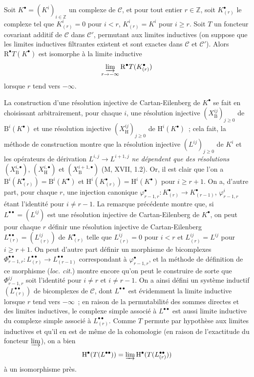 \begin{lemma}[11.5.1]
\label{0.11.5.1-fr}
Soit $K^\bullet=(K^i)_{i\in\mathbb Z}$ un complexe de $\mathcal C$, et pour
tout entier $r\in\mathbb Z$, soit $K_{(r)}^\bullet$ le complexe tel que
$K_{(r)}^i=0$ pour $i<r$, $K_{(r)}^i=K^i$ pour $i\geq r$. Soit $T$ un
foncteur covariant additif
de $\mathcal C$ dans $\mathcal C'$, permutant aux
limites inductives (on suppose que les limites inductives filtrantes existent
et sont exactes dans $\mathcal C$ et $\mathcal C'$). Alors
$\mathrm R^\bullet T(K^\bullet)$ est isomorphe à la limite inductive
\[
  \varinjlim_{r\to-\infty}\mathrm R^\bullet T(K_{(r)}^\bullet)
\]
lorsque $r$ tend vers $-\infty$.
\end{lemma}

La construction d'une résolution injective de Cartan-Eilenberg de $K^\bullet$
se fait en choisissant arbitrairement, pour chaque $i$, une résolution
injective $(X_{\mathrm B}^{ij})_{j\geq0}$ de $\mathrm B^i(K^\bullet)$ et une
résolution injective $(X_{\mathrm H}^{ij})_{j\geq0}$ de
$\mathrm H^i(K^\bullet)$~; cela fait, la méthode de construction montre que
la résolution injective $(L^{ij})_{j\geq0}$ de $K^i$ et les opérateurs de
dérivation $L^{i,j}\to L^{i+1,j}$ \emph{ne dépendent que des résolutions}
$(X_{\mathrm B}^{i,\bullet})$, $(X_{\mathrm H}^{i,\bullet})$ et
$(X_{\mathrm B}^{i+1,\bullet})$ (M, XVII, 1.2). Or, il est clair que l'on a
$\mathrm B^i(K_{(r)}^\bullet)=\mathrm B^i(K^\bullet)$ et
$\mathrm H^i(K_{(r)}^\bullet)=\mathrm H^i(K^\bullet)$ pour $i\geq r+1$. On
a, d'autre part, pour chaque $r$, une injection canonique
$\varphi_{r-1,r}^\bullet:K_{(r)}^\bullet\to K_{(r-1)}^\bullet$,
$\varphi_{r-1,r}^i$ étant l'identité pour $i\neq r-1$. La remarque précédente
montre que, si $L^{\bullet\bullet}=(L^{ij})$ est une résolution injective de
Cartan-Eilenberg de $K^\bullet$, on peut pour chaque $r$ définir une résolution
injective de Cartan-Eilenberg
$L_{(r)}^{\bullet\bullet}=(L_{(r)}^{ij})$ de $K_{(r)}^\bullet$ telle que
$L_{(r)}^{ij}=0$ pour $i<r$ et $L_{(r)}^{ij}=L^{ij}$ pour $i\geq r+1$. On peut
d'autre part définir un morphisme de bicomplexes
$\Phi_{r-1,r}^{\bullet\bullet}:L_{(r)}^{\bullet\bullet}\to
L_{(r-1)}^{\bullet\bullet}$ correspondant à $\varphi_{r-1,r}^\bullet$, et la
méthode de définition de ce morphisme (\emph{loc. cit.}) montre encore qu'on
peut le construire de sorte que $\Phi_{r-1,r}^{ij}$ soit l'identité pour
$i\neq r$ et $i\neq r-1$. On a ainsi défini un système inductif
$(L_{(r)}^{\bullet\bullet})$ de bicomplexes de $\mathcal C$, dont
$L^{\bullet\bullet}$ est évidemment la limite inductive lorsque $r$ tend vers
$-\infty$~; en raison de la permutabilité des sommes directes et des limites
inductives, le complexe simple associé à $L^{\bullet\bullet}$ est aussi limite
inductive du complexe simple associé à $L_{(r)}^{\bullet\bullet}$. Comme $T$
permute par hypothèse aux limites inductives et qu'il en est de même de la
cohomologie (en raison de l'exactitude du foncteur $\varinjlim$), on a bien
\[
  \mathrm H^\bullet(T(L^{\bullet\bullet}))=
  \varinjlim\mathrm H^\bullet(T(L_{(r)}^{\bullet\bullet}))
\]
à un isomorphisme près.

